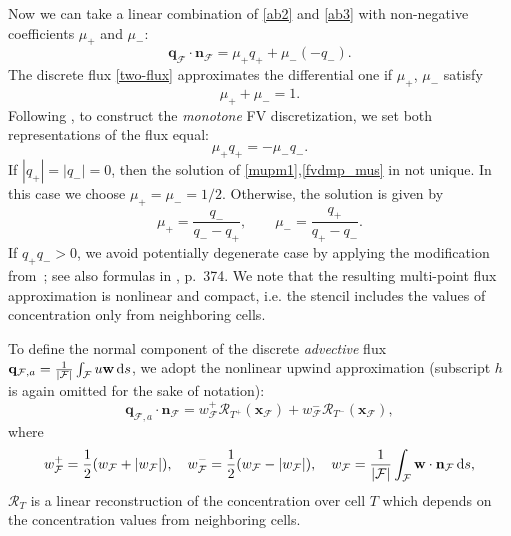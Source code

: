 \documentclass{article}
\newcommand{\bn}{\mathbf n}
\newcommand{\bw}{\mathbf w}
\newcommand{\bx}{\mathbf x}
\newcommand{\bq}{\mathbf q}
\newcommand{\F}{\mathcal F}
\newcommand{\cR}{\mathcal R}
\begin{document}
Now we can take a linear combination of \eqref{ab2} and \eqref{ab3} with non-negative coefficients $\mu_+$ and $\mu_-$:
\begin{equation}\label{two-flux}
  \bq_{\F} \cdot \bn_{\F} = \mu_+ q_+ + \mu_- (- q_-).
\end{equation}
The discrete flux \eqref{two-flux}  approximates the differential one if   $\mu_+$, $\mu_-$  satisfy
\begin{equation}
\label{mupm1}
\mu_+ + \mu_- = 1.
\end{equation}
Following \cite{Lipnikov:12}, to construct the {\it monotone}  FV discretization, we set  both representations of the flux equal:
\begin{equation}
\label{fvdmp_mus}
  \mu_+ q_+ = - \mu_- q_-.
\end{equation}
If $| q_+| = |q_-| = 0$, then the solution of \eqref{mupm1},\eqref{fvdmp_mus} in not unique. In this case we choose $\mu_+ = \mu_- = 1/2$.
Otherwise, the solution is given by
\begin{equation*}
\mu_+ = \frac{q_-}{q_- - q_+}, \qquad \mu_- = \frac{q_+}{q_+ - q_-}.
\end{equation*}
If $q_+ q_- > 0$, we avoid   potentially degenerate case by applying the modification from~\cite{ShengYuan:11}; see also formulas in \cite{Lipnikov:12}, p.~374.
We note that the resulting multi-point flux approximation is nonlinear and compact, i.e. the stencil includes the values of concentration only from neighboring cells.

To define the normal component of the discrete \textit{advective} flux
$\bq_{\F,a} =\frac{1}{|\F|} \int_{\F}  u\bw \,{\rm d}s$,
we adopt the nonlinear  upwind approximation (subscript $h$ is again omitted for the sake of notation):
\begin{equation}\label{vRvR}
  \bq_{\F,a} \cdot \bn_{\F} = w_{\F}^+  \cR_{T^+}(\bx_{\F}) + w_{\F}^-  \cR_{T^-}(\bx_{\F}),
\end{equation}
where
$$
w_{\F}^+ =\frac12 (w_{\F}+ |w_{\F}|), \quad w_{\F}^- =\frac12 (w_{\F}- |w_{\F}|), \quad w_{\F} = \frac{1}{|\F|} \int_{\F}  \bw\cdot\bn_{\F} \,{\rm d} s,
$$
$\cR_T$ is a linear reconstruction of the concentration
over cell $T$ which depends on the concentration values from neighboring cells.
\end{document}
